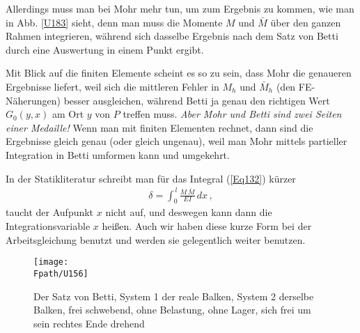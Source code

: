 {{{{Allerdings muss man bei Mohr mehr tun, um zum Ergebnis zu kommen, wie man in Abb. \ref{U183} sieht, denn man muss die Momente $M$ und $\bar{M}$ \"{u}ber den ganzen Rahmen integrieren, w\"{a}hrend sich dasselbe Ergebnis nach dem Satz von Betti durch eine Auswertung in einem Punkt ergibt.

Mit Blick auf die finiten Elemente scheint es so zu sein, dass Mohr die genaueren Ergebnisse liefert, weil sich die mittleren Fehler in $M_h$ und $\bar{M}_h$ (den FE-N\"{a}herungen) besser ausgleichen, w\"{a}hrend Betti ja genau den richtigen Wert $G_0(y,x)$ am Ort $y$ von $P$ treffen muss. {\em Aber Mohr und Betti sind zwei Seiten einer Medaille!\/} Wenn man mit finiten Elementen rechnet, dann sind die Ergebnisse gleich genau (oder gleich ungenau), weil man Mohr mittels partieller Integration in Betti umformen kann und umgekehrt.

\begin{remark}
In der Statikliteratur schreibt man f\"{u}r das Integral (\ref{Eq132}) k\"{u}rzer
\begin{align}
\delta = \int_0^{\,l} \frac{M\,\bar{M}}{EI}\,dx\,,
\end{align}
taucht der Aufpunkt $x$ nicht auf, und deswegen kann dann die Integrationsvariable $x$ hei{\ss}en. Auch wir haben diese kurze Form bei der Arbeitsgleichung benutzt und werden sie gelegentlich weiter benutzen.
\end{remark}

\begin{figure}[tbp]
\centering
\if {} \sidecaption \fi
\texttt{[image: \\Fpath/U156]}
\caption{Der Satz von Betti, System 1 der reale Balken, System 2 derselbe Balken, frei schwebend, ohne Belastung, ohne Lager, sich frei um sein rechtes Ende drehend } \label{U156}
\end{figure}%

}}}}
